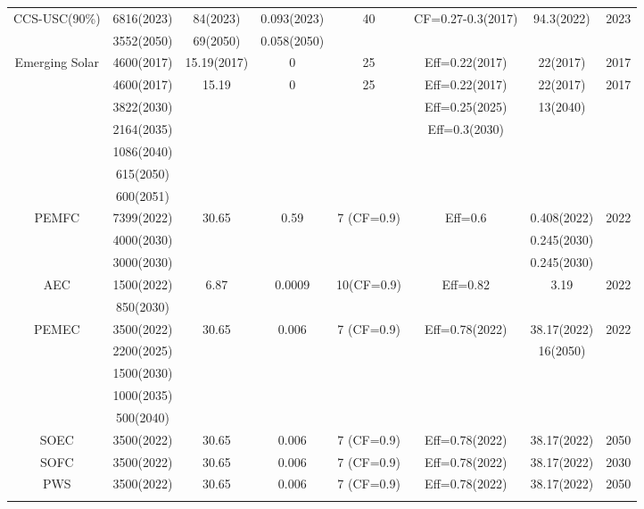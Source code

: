 \begin{landscape}
\begin{longtable}{ |*{8}{c|} }
CCS-USC(90\%) & 6816(2023) & 84(2023) & 0.093(2023) & 40 & CF=0.27-0.3(2017) & 94.3(2022) & 2023 \\
 & 3552(2050) & 69(2050) & 0.058(2050) &  &  &  & \\
Emerging Solar & 4600(2017) & 15.19(2017) & 0 & 25 & Eff=0.22(2017) & 22(2017) & 2017 \\
 & 4600(2017) & 15.19 & 0 & 25 & Eff=0.22(2017) & 22(2017) & 2017 \\
 & 3822(2030) &  &  &  & Eff=0.25(2025) &  13(2040) &  \\
 & 2164(2035) &  &  &  & Eff=0.3(2030) &  &  \\
  & 1086(2040) &  &  &  &  &  &  \\
 & 615(2050) &  &  &  &  &  &  \\
  & 600(2051) &  &  &  &  &  &  \\
\gls{PEMFC} & 7399(2022) & 30.65 & 0.59 & 7 (CF=0.9) & Eff=0.6 & 0.408(2022) & 2022\\
 & 4000(2030) &  &  &  &  & 0.245(2030) &  \\
 & 3000(2030) &  &  &  &  & 0.245(2030) &  \\
\gls{AEC} & 1500(2022) & 6.87 & 0.0009 & 10(CF=0.9) & Eff=0.82 & 3.19 & 2022\\
 & 850(2030) &  &  &  &  & &  \\
\gls{PEMEC} & 3500(2022) & 30.65 & 0.006 & 7 (CF=0.9) & Eff=0.78(2022) & 38.17(2022) & 2022\\
 & 2200(2025) &  &  &  &  & 16(2050) &  \\
 & 1500(2030) &  &  &  &  &  &  \\
 & 1000(2035) &  &  &  &  &  &  \\
 & 500(2040) &  &  &  &  &  &  \\
\gls{SOEC} & 3500(2022) & 30.65 & 0.006 & 7 (CF=0.9) & Eff=0.78(2022) & 38.17(2022) & 2050\\
\gls{SOFC} & 3500(2022) & 30.65 & 0.006 & 7 (CF=0.9) & Eff=0.78(2022) & 38.17(2022) & 2030\\
\gls{PWS} & 3500(2022) & 30.65 & 0.006 & 7 (CF=0.9) & Eff=0.78(2022) & 38.17(2022) & 2050\\
\label{eco}
\end{longtable}
\end{landscape}


